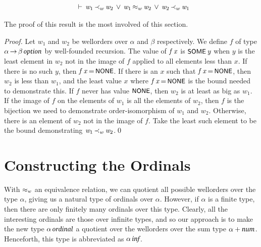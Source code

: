 \documentclass[11pt]{llncs}
\renewcommand{\HOLConst}[1]{{\textsf{\upshape\small #1}}}
\renewcommand{\HOLTyOp}[1]{\mbox{\fontencoding{T1}\fontfamily{bch}\fontseries{m}\fontshape{it}\fontsize{9.5}{10}\selectfont #1}}
\renewcommand{\HOLinline}[1]{\ensuremath{#1}}
\newenvironment{holmath}{\begin{displaymath}\begin{array}{l}}{\end{array}\end{displaymath}\ignorespacesafterend}
\begin{document}
\begin{theorem}
\begin{holmath}
\,\,\HOLTokenTurnstile{}\,\HOLFreeVar{w\sb{\mathrm{1}}}\,{\ensuremath{\prec_w}}\,\HOLFreeVar{w\sb{\mathrm{2}}}\,\HOLTokenDisj{}\,\HOLFreeVar{w\sb{\mathrm{1}}}\,\ensuremath{{\approx_w}}\,\HOLFreeVar{w\sb{\mathrm{2}}}\,\HOLTokenDisj{}\,\HOLFreeVar{w\sb{\mathrm{2}}}\,{\ensuremath{\prec_w}}\,\HOLFreeVar{w\sb{\mathrm{1}}}
\end{holmath}
\end{theorem}
The proof of this result is the most involved of this section.
\begin{proof}
Let $w_1$ and $w_2$ be wellorders over \HOLinline{\ensuremath{\alpha}} and \HOLinline{\ensuremath{\beta}} respectively.
We define $f$ of type \HOLinline{\ensuremath{\alpha}\,\ensuremath{{\rightarrow}}\,\ensuremath{\beta}\,\HOLTyOp{option}} by well-founded recursion.
The value of \HOLinline{\HOLFreeVar{f}\,\HOLFreeVar{x}} is \HOLinline{\HOLConst{SOME}\,\HOLFreeVar{y}} when $y$ is the least element in $w_2$ not in the image of $f$ applied to all elements less than $x$.
If there is no such $y$, then \HOLinline{\HOLFreeVar{f}\,\HOLFreeVar{x}\,{\ensuremath{=}}\,\HOLConst{NONE}}.
If there is an $x$ such that \HOLinline{\HOLFreeVar{f}\,\HOLFreeVar{x}\,{\ensuremath{=}}\,\HOLConst{NONE}}, then $w_2$ is less than $w_1$, and the least value $x$ where \HOLinline{\HOLFreeVar{f}\,\HOLFreeVar{x}\,{\ensuremath{=}}\,\HOLConst{NONE}} is the bound needed to demonstrate this.
If $f$ never has value \HOLinline{\HOLConst{NONE}}, then $w_2$ is at least as big as $w_1$.
If the image of $f$ on the elements of $w_1$ is all the elements of $w_2$, then $f$ is the bijection we need to demonstrate order-isomorphism of $w_1$ and $w_2$.
Otherwise, there is an element of $w_2$ not in the image of $f$.
Take the least such element to be the bound demonstrating \HOLinline{\HOLFreeVar{w\sb{\mathrm{1}}}\,{\ensuremath{\prec_w}}\,\HOLFreeVar{w\sb{\mathrm{2}}}}.\qed
\end{proof}

\section{Constructing the Ordinals}
\label{sec:constructing}

With \HOLinline{\HOLConst{\ensuremath{{\approx_w}}}} an equivalence relation, we can quotient all possible wellorders over the type \HOLinline{\ensuremath{\alpha}}, giving us a natural type of ordinals over \HOLinline{\ensuremath{\alpha}}.
However, if \HOLinline{\ensuremath{\alpha}} is a finite type, then there are only finitely many ordinals over this type.
Clearly, all the interesting ordinals are those over infinite types, and so our approach is to make the new type \HOLinline{\ensuremath{\alpha}\,\HOLTyOp{ordinal}} a quotient over the wellorders over the sum type \HOLinline{\alpha + \HOLTyOp{num}}.
Henceforth, this type is abbreviated as \HOLinline{\ensuremath{\alpha}\,\HOLTyOp{inf}}.
\end{document}
